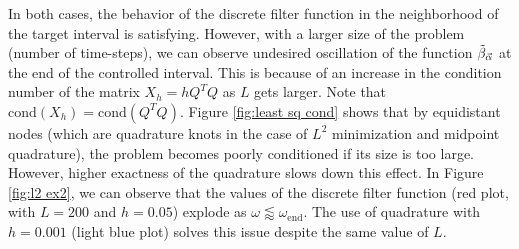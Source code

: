 \documentclass[a4paper,11pt,bibliography=totoc,listof=totoc,headinclude=true,cleardoublepage=empty,oneside]{scrbook}
\newcommand{\dffv}{\Tilde{\beta}_{\Vec{\alpha}}}
\newcommand{\e}{\mathrm{end}}
\begin{document}
In both cases, the behavior of the discrete filter function in the neighborhood of the target interval is satisfying. However, with a larger size of the problem (number of time-steps), we can observe undesired oscillation of the function $\dffv$ at the end of the controlled interval. This is because of an increase in the condition number of the matrix $X_h = hQ^TQ$ as $L$ gets larger. Note that $\mathrm{cond}(X_h) = \mathrm{cond}(Q^TQ)$. Figure \ref{fig:least sq cond} shows that by equidistant nodes (which are quadrature knots in the case of $L^2$ minimization and midpoint quadrature), the problem becomes poorly conditioned if its size is too large. However, higher exactness of the quadrature slows down this effect. In Figure \ref{fig:l2 ex2}, we can observe that the values of the discrete filter function (red plot, with $L=200$ and $h=0.05$) explode as $\omega \lessapprox \omega_\e$. The use of quadrature with $h=0.001$ (light blue plot) solves this issue despite the same value of $L$.
\end{document}
